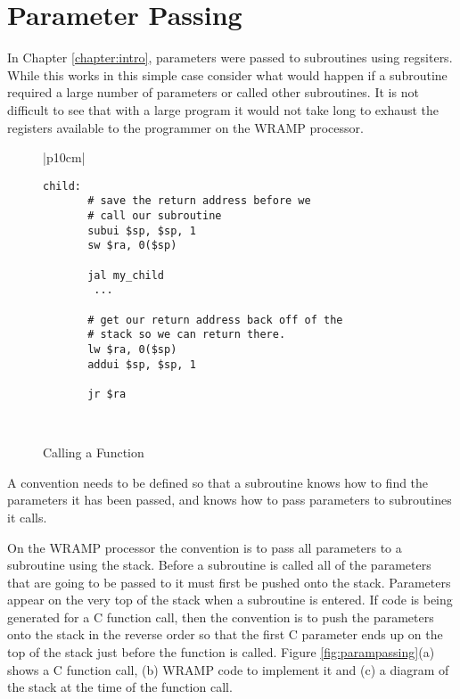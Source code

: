 \section{Parameter Passing}
In Chapter \ref{chapter:intro}, parameters were passed to
subroutines using regsiters. While this works in this simple case
consider what would happen if a subroutine required a large number of
parameters or called other subroutines. It is not difficult to see that
with a large program it would not take long to exhaust the registers
available to the programmer on the WRAMP processor.

%
%
\begin{figure}[!htbp]
\begin{footnotesize}
\begin{center}
\begin{tabular}{|p{10cm}|}
\hline
\begin{verbatim}
child:
       # save the return address before we
       # call our subroutine
       subui $sp, $sp, 1
       sw $ra, 0($sp)

       jal my_child
        ...

       # get our return address back off of the
       # stack so we can return there.
       lw $ra, 0($sp)
       addui $sp, $sp, 1

       jr $ra
\end{verbatim}
\\
\hline
\end{tabular}
\end{center}
\end{footnotesize}
\caption{Calling a Function}
\label{savera}
\end{figure}

A convention needs to be defined so that a subroutine knows how to
find the parameters it has been passed, and knows how to pass
parameters to subroutines it calls.

On the WRAMP processor the convention is to pass all parameters to a
subroutine using the stack. Before a subroutine is called all of the
parameters that are going to be passed to it must first be pushed onto
the stack. Parameters appear on the very top of the stack when a
subroutine is entered. If code is being generated for a C function
call, then the convention is to push the parameters onto the stack in
the reverse order so that the first C parameter ends up on the top of
the stack just before the function is called. Figure
\ref{fig:parampassing}(a) shows a C function call, (b) WRAMP code to
implement it and (c) a diagram of the stack at the time of the
function call.

